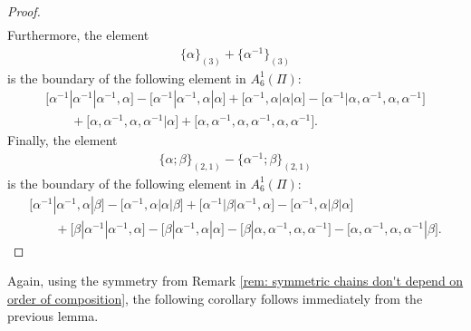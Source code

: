 \documentclass[pdftex]{sigma}
\numberwithin{equation}{section}
\begin{document}
\begin{proof}
\begin{gather*}
 \end{gather*}
 Furthermore, the element
 \begin{align*}
 \{\alpha\}_{(3)}+ \big\{\alpha^{-1}\big\}_{(3)}
 \end{align*}
 is the boundary of the following element in $A_{6}^1(\Pi)$:
 \begin{gather*}
 \big[\alpha^{-1}|\alpha^{-1}|\alpha^{-1},\alpha\big]-\big[\alpha^{-1}|\alpha^{-1},\alpha|\alpha\big]+\big[\alpha^{-1},\alpha|\alpha|\alpha\big]-\big[\alpha^{-1}|\alpha,\alpha^{-1},\alpha,\alpha^{-1}\big]\\ \qquad{}+\big[\alpha,\alpha^{-1},\alpha,\alpha^{-1}|\alpha\big] +\big[\alpha,\alpha^{-1},\alpha,\alpha^{-1},\alpha,\alpha^{-1}\big].
 \end{gather*}
 Finally, the element
 \begin{align*}
 \{\alpha;\beta\}_{(2,1)}-\big\{\alpha^{-1};\beta\big\}_{(2,1)}
 \end{align*}
 is the boundary of the following element in $A_{6}^1(\Pi)$:
 \begin{gather*}
 \big[\alpha^{-1}|\alpha^{-1},\alpha|\beta\big]-\big[\alpha^{-1},\alpha|\alpha|\beta\big]+\big[\alpha^{-1}|\beta|\alpha^{-1},\alpha\big]-\big[\alpha^{-1},\alpha|\beta|\alpha\big]\\
 \qquad{}+\big[\beta|\alpha^{-1}|\alpha^{-1},\alpha\big]-\big[\beta|\alpha^{-1},\alpha|\alpha\big]-\big[\beta|\alpha,\alpha^{-1},\alpha,\alpha^{-1}\big]-\big[\alpha,\alpha^{-1},\alpha,\alpha^{-1}|\beta\big].\tag*{\qed}
 \end{gather*}
\renewcommand{\qed}{}\end{proof}

Again, using the symmetry from Remark \ref{rem: symmetric chains don't depend on order of composition}, the following corollary follows immediately from the previous lemma.
\end{document}
